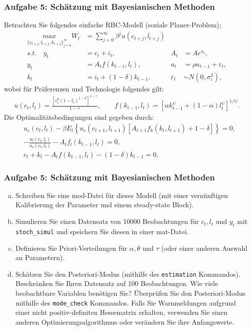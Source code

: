 \documentclass{beamer} %
\newcounter{saveenumi}
\newcommand{\seti}{\setcounter{saveenumi}{\value{enumi}}}
\begin{document}
\begin{frame}\frametitle{Aufgabe 5: Sch\"{a}tzung mit Bayesianischen Methoden}
Betrachten Sie folgendes einfache RBC-Modell (soziale Planer-Problem);
\begin{align*}
  \underset{\{c_{t+j},l_{t+j},k_{t+j}\}_{j=0}^\infty}{max} W_t &= \sum_{j=0}^\infty \beta^j u(c_{t+j},l_{t+j})\\
  s.t.\quad y_t &= c_t + i_t, & A_t &= A e^{a_t}, \\
  y_t &= A_t f(k_{t-1},l_t), & a_t &= \rho a_{t-1} + \varepsilon_t,\\
  k_t &= i_t +(1-\delta)k_{t-1}, &  \varepsilon_t &\sim N(0,\sigma_{\varepsilon}^2),
\end{align*}
wobei für Präferenzen und Technologie folgendes gilt:
\begin{align*}
  u(c_t,l_t)= \frac{\left[c_t^\theta (1-l_t)^{1-\theta}\right]^{1-\tau}}{1-\tau}, \qquad f(k_{t-1},l_t)=\left[\alpha k_{t-1}^\psi + (1-\alpha)l_t^\psi\right]^{1/\psi}.
\end{align*}
Die Optimalitätsbedingungen sind gegeben durch:
\begin{eqnarray*}
 &u_c(c_t,l_t) - \beta E_t \left\{u_c(c_{t+1},l_{t+1}) \left[A_{t+1} f_k(k_t, l_{t+1})+1-\delta \right]\right\} = 0,\\
 & -\frac{u_l(c_t,l_t)}{u_c(c_t,l_t)}-A_t f_l(k_{t-1},l_t)=0,\\
 & c_t + k_t -A_t f(k_{t-1},l_t) -(1-\delta)k_{t-1}=0.
\end{eqnarray*}
\end{frame}

\begin{frame}\frametitle{Aufgabe 5: Sch\"{a}tzung mit Bayesianischen Methoden}
\begin{enumerate}[(a)]
  \item Schreiben Sie eine mod-Datei für dieses Modell (mit einer vernünftigen Kalibrierung der Parameter und einem steady-state Block).
  \item Simulieren Sie einen Datensatz von 10000 Beobachtungen für $c_t,l_t$ und $y_t$ mit \texttt{stoch\_simul} und speichern Sie diesen in einer mat-Datei.
  \item Definieren Sie Priori-Verteilungen für $\alpha,\theta$ und $\tau$ (oder einer anderen Auswahl an Parametern).
  \item Schätzen Sie den Posteriori-Modus (mithilfe des \texttt{estimation} Kommandos). Beschränken Sie Ihren Datensatz auf 100 Beobachtungen. Wie viele beobachtbare Variablen benötigen Sie? Überprüfen Sie den Posteriori-Modus mithilfe des \texttt{mode\_check} Kommandos. Falls Sie Warnmeldungen aufgrund einer nicht positiv-definiten Hessematrix erhalten, verwenden Sie einen anderen Optimierungsalgorithmus oder verändern Sie ihre Anfangswerte.
\seti
\end{enumerate}
\end{frame}
\end{document}
